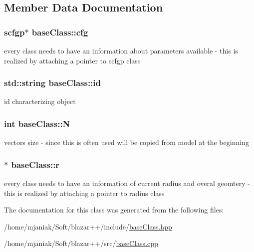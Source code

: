 \subsection{Member Data Documentation}
\hypertarget{classbaseClass_a744f87a6ebe63da08256c022d42a4ca7}{
\subsubsection[{cfg}]{\setlength{\rightskip}{0pt plus 5cm}scfgp$\ast$ base\-Class\-::cfg}}\label{classbaseClass_a744f87a6ebe63da08256c022d42a4ca7}
every class needs to have an information about parameters available -\/ this is realized by attaching a pointer to scfgp class \hypertarget{classbaseClass_a4d5ff386a69bcbe21b5976f55b624df6}{
\subsubsection[{id}]{\setlength{\rightskip}{0pt plus 5cm}std\-::string base\-Class\-::id}}\label{classbaseClass_a4d5ff386a69bcbe21b5976f55b624df6}
id characterizing object \hypertarget{classbaseClass_a2b4d07d2b46197d495de0477f4bb22f8}{
\subsubsection[{N}]{\setlength{\rightskip}{0pt plus 5cm}int base\-Class\-::\-N}}\label{classbaseClass_a2b4d07d2b46197d495de0477f4bb22f8}
vectors size -\/ since this is often used will be copied from model at the beginning \hypertarget{classbaseClass_a482bb9b1d94f3eb3f31026d14e9a2bb6}{
\subsubsection[{r}]{$\ast$ base\-Class\-::r}}\label{classbaseClass_a482bb9b1d94f3eb3f31026d14e9a2bb6}
every class needs to have an information of current radius and overal geomtery -\/ this is realized by attaching a pointer to radius class 

The documentation for this class was generated from the following files\-:\begin{DoxyCompactItemize}
\item 
/home/mjaniak/\-Soft/blazar++/include/\hyperlink{baseClass_8hpp}{base\-Class.\-hpp}\item 
/home/mjaniak/\-Soft/blazar++/src/\hyperlink{baseClass_8cpp}{base\-Class.\-cpp}\end{DoxyCompactItemize}
